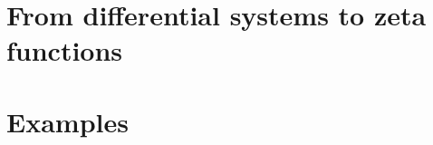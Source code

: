 \chapter{From differential systems to zeta functions}
\label{ch:01-Main}




\chapter{Examples}
\label{ch:01-Exmp}



